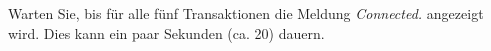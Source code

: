         \item Warten Sie, bis für alle fünf Transaktionen die Meldung \textit{Connected.} angezeigt wird. Dies kann ein paar Sekunden (ca. 20) dauern.
